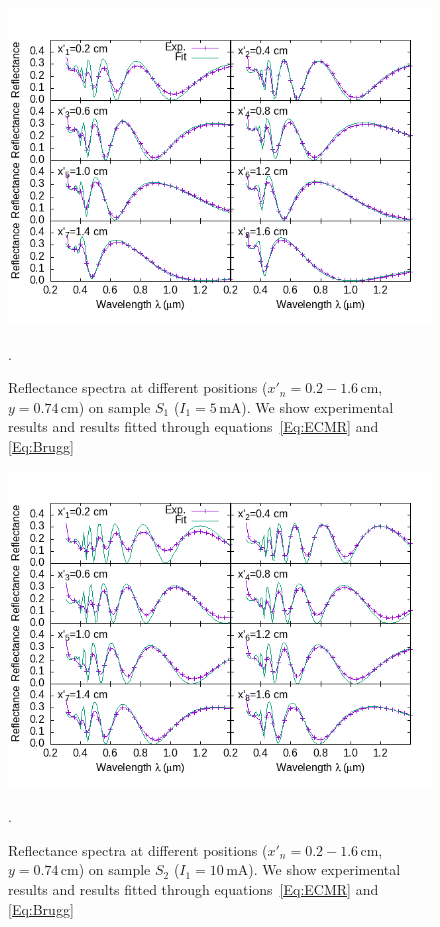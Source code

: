 \documentclass[review,sort&compress]{cas-sc}
\begin{document}
\begin{figure}
  \centering
  \includegraphics[width=\textwidth]{fig8}
  \caption{Reflectance spectra at different positions
    ($x'_n=0.2-1.6\,\text{cm}$, $y=0.74\,\text{cm}$)
    on sample $S_1$ ($I_1=5\,\text{mA}$). We show
  experimental results and results fitted through
  equations~\eqref{Eq:ECMR} and \eqref{Eq:Brugg}}.
  \label{fig:R5}
\end{figure}
\begin{figure}
  \centering
  \includegraphics[width=\textwidth]{fig9}
  \caption{Reflectance spectra at different positions
    ($x'_n=0.2-1.6\,\text{cm}$, $y=0.74\,\text{cm}$)
    on sample $S_2$ ($I_1=10\,\text{mA}$). We show
  experimental results and results fitted through
  equations~\eqref{Eq:ECMR} and \eqref{Eq:Brugg}}.
  \label{fig:R10}
\end{figure}
\end{document}
